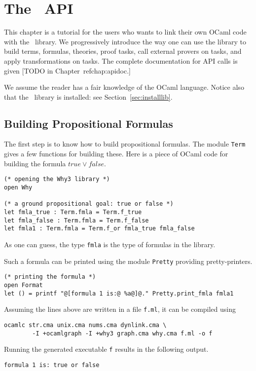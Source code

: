 \chapter{The \why\ API}
\label{chap:api}

This chapter is a tutorial for the users who wants to link their own
OCaml code with the \why\ library. We progressively introduce the way
one can use the library to build terms, formulas, theories, proof
tasks, call external provers on tasks, and apply transformations on
tasks. The complete documentation for API calls is given 
[TODO in Chapter~ref{chap:apidoc}.]

We assume the reader has a fair knowledge of the OCaml
language. Notice also that the \why\ library is installed: see
Section~\ref{sec:installlib}.


\section{Building Propositional Formulas}

The first step is to know how to build propositional formulas. The
module \texttt{Term} gives a few functions for building these. Here is
a piece of OCaml code for building the formula $true \lor false$.
\begin{verbatim}
(* opening the Why3 library *)
open Why

(* a ground propositional goal: true or false *)
let fmla_true : Term.fmla = Term.f_true
let fmla_false : Term.fmla = Term.f_false
let fmla1 : Term.fmla = Term.f_or fmla_true fmla_false
\end{verbatim}
As one can guess, the type \texttt{fmla} is the type of formulas in
the library.

Such a formula can be printed using the module \texttt{Pretty}
providing pretty-printers.
\begin{verbatim}
(* printing the formula *)
open Format
let () = printf "@[formula 1 is:@ %a@]@." Pretty.print_fmla fmla1
\end{verbatim}

Assuming the lines above are written in a file \texttt{f.ml}, it can
be compiled using
\begin{verbatim}
ocamlc str.cma unix.cma nums.cma dynlink.cma \
        -I +ocamlgraph -I +why3 graph.cma why.cma f.ml -o f
\end{verbatim}
Running the generated executable \texttt{f} results in the following output.
\begin{verbatim}
formula 1 is: true or false
\end{verbatim}

